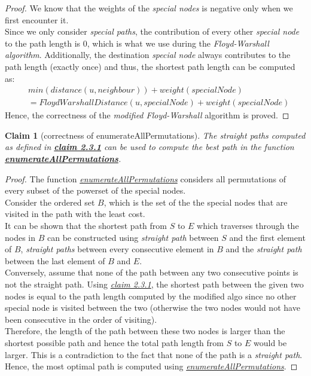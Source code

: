 \documentclass[12pt]{report}
\newtheorem{claim}[theorem]{Claim}
\begin{document}
\begin{proof}
We know that the weights of the \textit{special nodes} is negative only when we first encounter it.\\
Since we only consider \textit{special paths}, the contribution of every other \textit{special node} to the path length is $0$, which is what we use during the \textit{Floyd-Warshall algorithm}. Additionally, the destination \textit{special node} always contributes to the path length (exactly once) and thus, the shortest path length can be computed as:
\begin{equation}
\begin{aligned}
    &{min}({distance}(u, neighbour)) + {weight}({specialNode})\\
    &= {FloydWarshallDistance}(u, {specialNode}) + {weight}({specialNode})
\end{aligned}
\end{equation}
Hence, the correctness of the \textit{modified Floyd-Warshall} algorithm is proved.
\end{proof}

\begin{claim}[correctness of enumerateAllPermutations]
The \textit{straight paths} computed as defined in \hyperref[claim:dist-prop]{\textbf{claim 2.3.1}} can be used to compute the best path in the function \hyperref[pseudo:perms]{\textbf{enumerateAllPermutations}}.
\end{claim}

\begin{proof}
The function \hyperref[pseudo:perms]{\textit{enumerateAllPermutations}} considers all permutations of every subset of the powerset of the special nodes.\\
Consider the ordered set $B$, which is the set of the the special nodes that are visited in the path with the least cost.\\
It can be shown that the shortest path from $S$ to $E$ which traverses through the nodes in $B$ can be constructed using \textit{straight path} between $S$ and the first element of $B$, \textit{straight paths} between every consecutive element in $B$ and the \textit{straight path} between the last element of $B$ and $E$.\\
Conversely, assume that none of the path between any two consecutive points is not the straight path. Using \hyperref[claim:dist-prop]{\textit{claim 2.3.1}}, the shortest path between the given two nodes is equal to the path length computed by the modified algo since no other special node is visited between the two (otherwise the two nodes would not have been consecutive in the order of visiting).\\
Therefore, the length of the path between these two nodes is larger than the shortest possible path and hence the total path length from $S$ to $E$ would be larger. This is a contradiction to the fact that none of the path is a \textit{straight path}.
Hence, the most optimal path is computed using \hyperref[pseudo:perms]{\textit{enumerateAllPermutations}}.
\end{proof}
\end{document}
